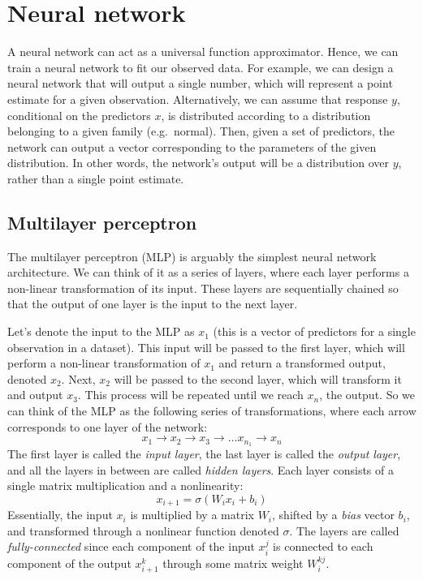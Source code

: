 \documentclass[12pt]{article}
\begin{document}
\section{Neural network}

A neural network can act as a universal function approximator. Hence, we can train a neural network to fit our observed data. For example, we can design a neural network that will output a single number, which will represent a point estimate for a given observation. Alternatively, we can assume that response $y$, conditional on the predictors $x$, is distributed according to a distribution belonging to a given family (e.g.\ normal). Then, given a set of predictors, the network can output a vector corresponding to the parameters of the given distribution. In other words, the network's output will be a distribution over $y$, rather than a single point estimate. 

\subsection{Multilayer perceptron}

The multilayer perceptron (MLP) is arguably the simplest neural network architecture. We can think of it as a series of layers, where each layer performs a non-linear transformation of its input. These layers are sequentially chained so that the output of one layer is the input to the next layer.

Let's denote the input to the MLP as $x_1$ (this is a vector of predictors for a single observation in a dataset). This input will be passed to the first layer, which will perform a non-linear transformation of $x_1$ and return a transformed output, denoted $x_2$. Next, $x_2$ will be passed to the second layer, which will transform it and output $x_3$. This process will be repeated until we reach $x_n$, the output. So we can think of the MLP as the following series of transformations, where each arrow corresponds to one layer of the network:
\begin{equation}
x_1 \rightarrow x_2 \rightarrow x_3 \rightarrow \ldots x_{n_1} \rightarrow x_n
\end{equation}
The first layer is called the \textit{input layer}, the last layer is called the \textit{output layer}, and all the layers in between are called \textit{hidden layers}. Each layer consists of a single matrix multiplication and a nonlinearity:
\begin{equation}
x_{i+1} = \sigma(W_i x_i + b_i)
\end{equation}
Essentially, the input $x_i$ is multiplied by a matrix $W_i$, shifted by a \textit{bias} vector $b_i$, and transformed through a nonlinear function denoted $\sigma$. The layers are called \textit{fully-connected} since each component of the input $x_i^j$ is connected to each component of the output $x_{i+1}^k$ through some matrix weight $W_i^{kj}$.
\end{document}
